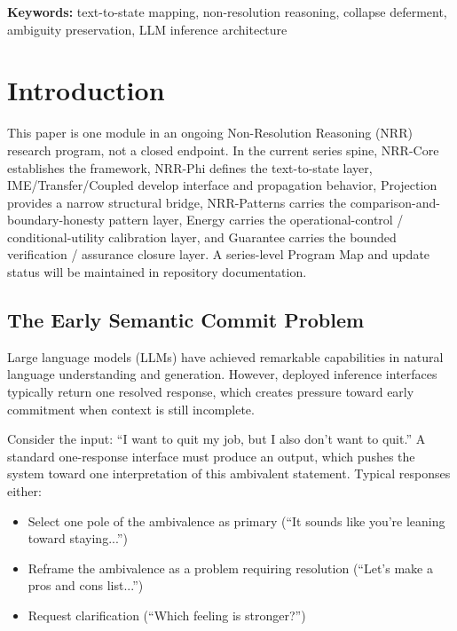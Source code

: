 \documentclass[11pt,a4paper]{article}
\begin{document}
\noindent\textbf{Keywords:} text-to-state mapping, non-resolution reasoning, collapse deferment, 
ambiguity preservation, LLM inference architecture

\section{Introduction}
\label{sec:intro}

This paper is one module in an ongoing Non-Resolution Reasoning (NRR) research program, not a closed endpoint. In the current series spine, NRR-Core establishes the framework, NRR-Phi defines the text-to-state layer, IME/Transfer/Coupled develop interface and propagation behavior, Projection provides a narrow structural bridge, NRR-Patterns carries the comparison-and-boundary-honesty pattern layer, Energy carries the operational-control / conditional-utility calibration layer, and Guarantee carries the bounded verification / assurance closure layer. A series-level Program Map and update status will be maintained in repository documentation.

\subsection{The Early Semantic Commit Problem}

Large language models (LLMs) have achieved remarkable capabilities in natural language 
understanding and generation. However, deployed inference interfaces typically return
one resolved response, which creates pressure toward early commitment when context is
still incomplete.

Consider the input: ``I want to quit my job, but I also don't want to quit.'' 
A standard one-response interface must produce an output, which pushes the system toward
one interpretation of this ambivalent statement. Typical responses either:
\begin{itemize}
    \item Select one pole of the ambivalence as primary (``It sounds like you're leaning toward staying...'')
    \item Reframe the ambivalence as a problem requiring resolution (``Let's make a pros and cons list...'')
    \item Request clarification (``Which feeling is stronger?'')
\end{itemize}
\end{document}
